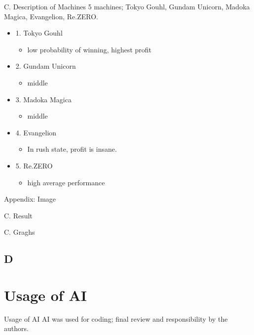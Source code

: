 \documentclass{beamer}
\begin{document}
\begin{frame}{C. Description of Machines}
5 machines; Tokyo Gouhl, Gundam Unicorn, Madoka Magica, Evangelion, Re.ZERO.
\begin{itemize}
    \item 1. Tokyo Gouhl
    \begin{itemize}
        \item low probability of winning, highest profit
    \end{itemize}
    \item 2. Gundam Unicorn
    \begin{itemize}
        \item middle
    \end{itemize}
    \item 3. Madoka Magica 
    \begin{itemize}
        \item middle
    \end{itemize}
    \item 4. Evangelion
    \begin{itemize}
        \item In rush state, profit is insane.
    \end{itemize}
    \item 5. Re.ZERO
    \begin{itemize}
        \item high average performance
    \end{itemize}
\end{itemize}
\end{frame}

\begin{frame}{Appendix: Image}
    
\end{frame}
\begin{frame}{C. Result}

    
\end{frame}
\begin{frame}{C. Graghs}

    
\end{frame}


    

\subsection{D}


\section{Usage of AI}
\begin{frame}{Usage of AI}
    AI was used for coding; final review and responsibility by the authors.
\end{frame}
\end{document}
